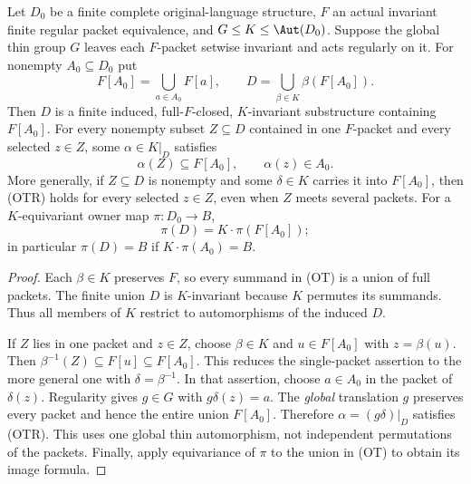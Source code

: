 \begin{lemma}
\label{lem:acf-invariant-packet-orbit-trim}
Let $D_0$ be a finite complete original-language structure,
$F$ an actual invariant finite regular packet equivalence, and
$G\le K\le\Aut(D_0)$. Suppose the global thin group $G$
leaves each $F$-packet setwise invariant and acts regularly on it.
For nonempty $A_0\subseteq D_0$ put
\[
 F[A_0]=\bigcup_{a\in A_0}F[a],
 \qquad D=\bigcup_{\beta\in K}\beta(F[A_0]).
\tag{OT}\label{eq:acf-packet-orbit-trim}
\]
Then $D$ is a finite induced, full-$F$-closed, $K$-invariant
substructure containing $F[A_0]$. For every nonempty subset
$Z\subseteq D$ contained in one $F$-packet and every selected
$z\in Z$, some $\alpha\in K|_D$ satisfies
\[
 \alpha(Z)\subseteq F[A_0],\qquad \alpha(z)\in A_0.
\tag{OTR}\label{eq:acf-packet-orbit-root}
\]
More generally, if $Z\subseteq D$ is nonempty and some
$\delta\in K$ carries it into $F[A_0]$, then \textup{(OTR)}
holds for every selected $z\in Z$, even when $Z$ meets several
packets. For a $K$-equivariant owner map $\pi:D_0\to B$,
\[
                    \pi(D)=K\cdot\pi(F[A_0]);
\]
in particular $\pi(D)=B$ if $K\cdot\pi(A_0)=B$.
\end{lemma}
\begin{proof}
Each $\beta\in K$ preserves $F$, so every summand in
\textup{(OT)} is a union of full packets. The finite union $D$
is $K$-invariant because $K$ permutes its summands. Thus all
members of $K$ restrict to automorphisms of the induced $D$.

If $Z$ lies in one packet and $z\in Z$, choose
$\beta\in K$ and $u\in F[A_0]$ with $z=\beta(u)$.
Then $\beta^{-1}(Z)\subseteq F[u]\subseteq F[A_0]$.
This reduces the single-packet assertion to the more general
one with $\delta=\beta^{-1}$. In that assertion, choose
$a\in A_0$ in the packet of $\delta(z)$. Regularity gives
$g\in G$ with $g\delta(z)=a$. The \emph{global} translation
$g$ preserves every packet and hence the entire union $F[A_0]$.
Therefore $\alpha=(g\delta)|_D$ satisfies \textup{(OTR)}.
This uses one global thin automorphism, not independent
permutations of the packets. Finally, apply equivariance of
$\pi$ to the union in \textup{(OT)} to obtain its image formula.
\end{proof}

